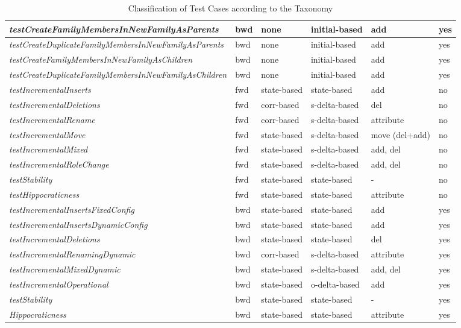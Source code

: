 \begin{table*}[!tbp]
\begin{tabular}{M{7cm}|M{1.4cm}|M{1.6cm}|M{1.9cm}|M{1.3cm}|M{1.3cm}}
		\textit{testCreateFamilyMembersInNewFamily\-As\-Parents} & bwd & none & initial-based & add & yes \\ \hline
		\textit{testCreateDuplicateFamilyMembersInNewFamily\-As\-Parents} & bwd & none & initial-based & add & yes \\ \hline
		\textit{testCreateFamilyMembersInNewFamily\-As\-Children} & bwd & none & initial-based & add & yes \\ \hline
		\textit{testCreateDuplicateFamilyMembersInNewFamily\-As\-Children} & bwd & none & initial-based & add & yes \\ \hline
		\textit{testIncrementalInserts} & fwd & state-based & state-based & add & no\\ \hline
		\textit{testIncrementalDeletions} & fwd & corr-based & s-delta-based & del & no \\ \hline
		\textit{testIncrementalRename} & fwd & corr-based & s-delta-based & attribute & no \\ \hline
		\textit{testIncrementalMove} & fwd & state-based & s-delta-based & move (del+add) & no \\ \hline
		\textit{testIncrementalMixed} & fwd & state-based & s-delta-based & add, del & no \\ \hline
		\textit{testIncrementalRoleChange} & fwd & state-based & s-delta-based & add, del & no\\ \hline
		\textit{testStability} & fwd & state-based & state-based & - & no \\ \hline
		\textit{testHippocraticness} & fwd & state-based & state-based & attribute & no\\ \hline
		\textit{testIncrementalInsertsFixedConfig} & bwd & state-based & state-based & add & yes \\ \hline
		\textit{testIncrementalInsertsDynamicConfig} & bwd & state-based & state-based & add & yes \\ \hline
		\textit{testIncrementalDeletions} & bwd & state-based & state-based & del & yes \\ \hline
		\textit{testIncrementalRenamingDynamic} & bwd & corr-based & s-delta-based & attribute & yes \\ \hline
		\textit{testIncrementalMixedDynamic} & bwd & state-based & s-delta-based & add, del & yes \\ \hline
		\textit{testIncrementalOperational} & bwd & state-based & o-delta-based & add & yes \\ \hline
		\textit{testStability} & bwd & state-based & state-based & - & yes \\ \hline
		\textit{Hippocraticness} & bwd & state-based & state-based & attribute & yes \\ \hline
	\end{tabular}
	\caption{Classification of Test Cases according to the Taxonomy}
	\label{tab:classification-test-cases}
\end{table*}